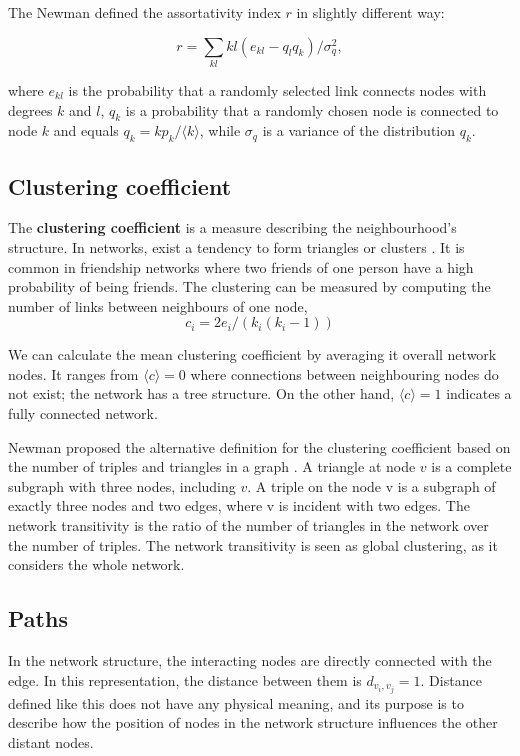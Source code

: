 The Newman defined the assortativity \cite{newman2002assortative} index $r$ in slightly different way:

\begin{equation}
r = \sum_{kl}kl(e_{kl} - q_lq_k) / \sigma_q^2 ,
\end{equation}

where $e_{kl}$ is the probability that a randomly selected link connects nodes with degrees $k$ and $l$, $q_k$ is a probability that a randomly chosen node is connected to node $k$ and equals $q_k = kp_k / \langle k \rangle$, while $\sigma_q$ is a variance of the distribution $q_k$. 

\subsection{Clustering coefficient}

The \textbf{clustering coefficient} is a measure describing the neighbourhood's structure. In networks, exist a tendency to form triangles or clusters \cite{barabasi2016network}. It is common in friendship networks where two friends of one person have a high probability of being friends. %
The clustering can be measured by computing the number of links between neighbours of one node,
\begin{equation}
c_i=2e_i/(k_i(k_i-1))
\end{equation}

We can calculate the mean clustering coefficient by averaging it overall network nodes. It ranges from  $\langle c \rangle = 0$ where connections between neighbouring nodes do not exist; the network has a tree structure. On the other hand, $\langle c \rangle = 1$ indicates a fully connected network. 

Newman proposed the alternative definition for the clustering coefficient based on the number of triples and triangles in a graph \cite{newman2009random}. A triangle at node $v$ is a complete subgraph with three nodes, including $v$. A triple on the node v is a subgraph of exactly three nodes and two edges, where v is incident with two edges. The network transitivity is the ratio of the number of triangles in the network over the number of triples. The network transitivity is seen as global clustering, as it considers the whole network.  

\subsection{Paths} %
In the network structure, the interacting nodes are directly connected with the edge. In this representation, the distance between them is $d_{v_i, v_j} =1 $. Distance defined like this does not have any physical meaning, and its purpose is to describe how the position of nodes in the network structure influences the other distant nodes. 

